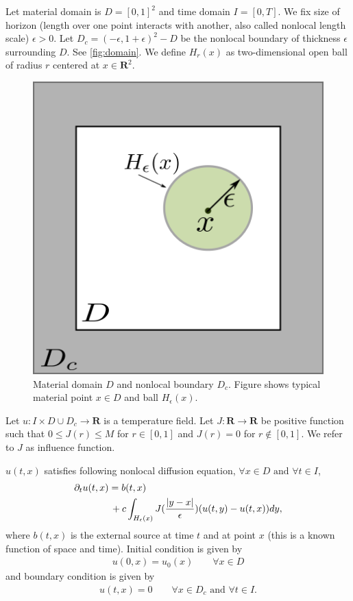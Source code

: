 \documentclass[11pt,twocolumn]{amsart}
\theoremstyle{definition}
\theoremstyle{definition}
\numberwithin{equation}{section}
\numberwithin{equation}{section}
\newcommand{\R}{\mathbf{R}}  %
\begin{document}
Let material domain is $D = [0,1]^2$ and time domain $I = [0,T]$. We fix size of horizon (length over one point interacts with another, also called nonlocal length scale) $\epsilon>0$. Let $D_c = (-\epsilon, 1+\epsilon)^2 - D$ be the nonlocal boundary of thickness $\epsilon$ surrounding $D$. See \autoref{fig:domain}. We define $H_r(x)$ as two-dimensional open ball of radius $r$ centered at $x\in \R^2$.

\begin{figure}
\centering
\includegraphics[scale=0.5]{material_domain.png}
\caption{Material domain $D$ and nonlocal boundary $D_c$. Figure shows typical material point $x\in D$ and ball $H_\epsilon(x)$. }\label{fig:domain}
\end{figure}

Let $u:I \times D\cup D_c \to \R$ is a temperature field. Let $J:\R \to \R$ be positive function such that $0\leq J(r) \leq M$ for $r\in [0,1]$ and $J(r) = 0$ for $r\notin [0,1]$. We refer to $J$ as influence function. 

$u(t,x)$ satisfies following nonlocal diffusion equation, $\forall x\in D \text{ and } \forall t \in I$,
\begin{align}\label{eq:diff eqn}
\partial_t u(t,x) &=  b(t,x) \notag \\
&\,+ c \int_{H_\epsilon(x)} J(\frac{|y-x|}{\epsilon}) (u(t,y) - u(t,x)) dy,
\end{align}
where $b(t,x)$ is the external source at time $t$ and at point $x$ (this is a known function of space and time). Initial condition is given by
\begin{align}\label{eq:ic}
u(0,x) = u_0(x) \qquad \forall x\in D
\end{align}
and boundary condition is given by
\begin{align} \label{eq:bc}
u(t,x) = 0 \qquad \forall x\in D_c \text{ and } \forall t\in I.
\end{align}
\end{document}
